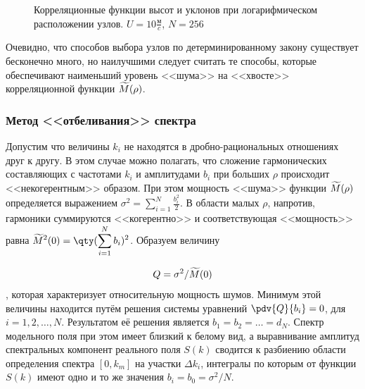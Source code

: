 \begin{figure}[h!]
\begin{minipage}{0.49\linewidth}
			\label{fig:ca1}		
	\end{minipage}
	\caption{Корреляционные функции высот и уклонов при логарифмическом расположении узлов. $U=10 \frac{\text{м}}{c}$, $N=256$}
\end{figure}



Очевидно, что способов выбора узлов по детерминированному закону существует бесконечно много, но наилучшими следует считать те способы, которые обеспечивают наименьший уровень <<шума>> на <<хвосте>> корреляционной функции $\widetilde{M}(\rho)$.

\subsubsection{Метод <<отбеливания>> спектра}
Допустим что величины $k_i$ не находятся в дробно-рациональных отношениях друг к другу. В этом случае можно полагать, что сложение гармонических составляющих с частотами $k_i$ и амплитудами $b_i$ при больших $\rho$ происходит <<некогерентным>> образом. При этом мощность <<шума>> функции $\widetilde{M}(\rho)$ определяется выражением 
$\displaystyle \sigma^2= \sum_{i=1}^N \frac{b_i^2}{2}$. В области малых $\rho$, напротив, гармоники суммируются <<когерентно>> и соответствующая <<мощность>> равна 
$\displaystyle \tM^2(0)=\qty(\sum_{i=1}^N b_i)^2$. Образуем величину 

\begin{equation}
	\label{eq:Q}
	Q=\sigma^2/\widetilde{M}(0)
\end{equation}, которая характеризует относительную мощность шумов. Минимум этой величины находится путём решения системы уравнений $\pdv{Q}{b_i}=0$, для $i=1,2,\dots,N.$
Результатом её решения является $b_1=b_2=\dots = d_N$. Спектр модельного поля при этом имеет близкий к белому вид, а выравнивание амплитуд спектральных компонент реального поля $S(k)$ сводится к разбиению области определения спектра $[0, k_m]$ на участки $\Delta k_i$, интегралы по которым от функции $S(k)$ имеют одно и то же значения $b_i=b_0=\sigma^2/N$.

